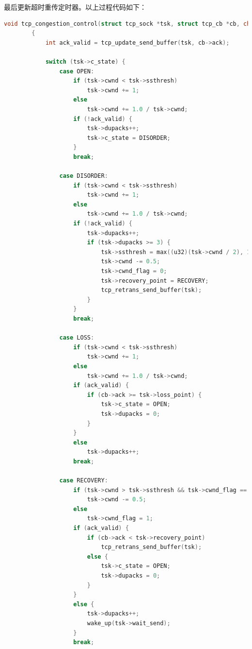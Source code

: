 \documentclass[UTF8]{report}
\begin{document}
\begin{enumerate}
    最后更新超时重传定时器。以上过程代码如下：

    \begin{lstlisting}[language=C]
        void tcp_congestion_control(struct tcp_sock *tsk, struct tcp_cb *cb, char *packet)
        {
            int ack_valid = tcp_update_send_buffer(tsk, cb->ack);
        
            switch (tsk->c_state) {
                case OPEN: 
                    if (tsk->cwnd < tsk->ssthresh)
                        tsk->cwnd += 1;
                    else
                        tsk->cwnd += 1.0 / tsk->cwnd;
                    if (!ack_valid) {
                        tsk->dupacks++;
                        tsk->c_state = DISORDER;
                    }
                    break;
        
                case DISORDER:
                    if (tsk->cwnd < tsk->ssthresh)
                        tsk->cwnd += 1;
                    else
                        tsk->cwnd += 1.0 / tsk->cwnd;
                    if (!ack_valid) {
                        tsk->dupacks++;
                        if (tsk->dupacks >= 3) {
                            tsk->ssthresh = max((u32)(tsk->cwnd / 2), 1);
                            tsk->cwnd -= 0.5;
                            tsk->cwnd_flag = 0;
                            tsk->recovery_point = RECOVERY;
                            tcp_retrans_send_buffer(tsk);
                        }
                    }
                    break;
        
                case LOSS:
                    if (tsk->cwnd < tsk->ssthresh)
                        tsk->cwnd += 1;
                    else
                        tsk->cwnd += 1.0 / tsk->cwnd;
                    if (ack_valid) {
                        if (cb->ack >= tsk->loss_point) {
                            tsk->c_state = OPEN;
                            tsk->dupacks = 0;
                        }
                    }
                    else
                        tsk->dupacks++;
                    break;
        
                case RECOVERY:
                    if (tsk->cwnd > tsk->ssthresh && tsk->cwnd_flag == 0)
                        tsk->cwnd -= 0.5;
                    else
                        tsk->cwnd_flag = 1;
                    if (ack_valid) {
                        if (cb->ack < tsk->recovery_point) 
                            tcp_retrans_send_buffer(tsk);
                        else {
                            tsk->c_state = OPEN;
                            tsk->dupacks = 0;
                        }
                    }
                    else {
                        tsk->dupacks++;
                        wake_up(tsk->wait_send);
                    }
                    break;
        

\end{lstlisting}
\end{enumerate}
\end{document}
